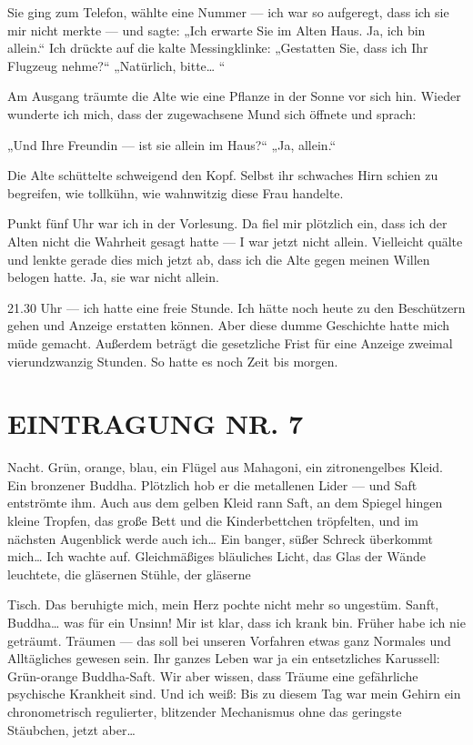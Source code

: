 Sie ging zum Telefon, wählte eine Nummer — ich war so aufgeregt,
dass ich sie mir nicht merkte — und sagte: „Ich erwarte Sie im
Alten Haus. Ja, ich bin allein.“ Ich drückte auf die kalte
Messingklinke: „Gestatten Sie, dass ich Ihr Flugzeug nehme?“
„Natürlich, bitte\ldots{} “

Am Ausgang träumte die Alte wie eine Pflanze in der Sonne vor sich
hin. Wieder wunderte ich mich, dass der zugewachsene Mund sich
öffnete und sprach:

„Und Ihre Freundin — ist sie allein im Haus?“ „Ja, allein.“

Die Alte schüttelte schweigend den Kopf. Selbst ihr schwaches Hirn
schien zu begreifen, wie tollkühn, wie wahnwitzig diese Frau
handelte.

Punkt fünf Uhr war ich in der Vorlesung. Da fiel mir plötzlich ein,
dass ich der Alten nicht die Wahrheit gesagt hatte — I war jetzt
nicht allein. Vielleicht quälte und lenkte gerade dies mich jetzt
ab, dass ich die Alte gegen meinen Willen belogen hatte. Ja, sie
war nicht allein.

21.30 Uhr — ich hatte eine freie Stunde. Ich hätte noch heute zu
den Beschützern gehen und Anzeige erstatten können. Aber diese
dumme Geschichte hatte mich müde gemacht. Außerdem beträgt die
gesetzliche Frist für eine Anzeige zweimal vierundzwanzig Stunden.
So hatte es noch Zeit bis morgen.

\section{EINTRAGUNG NR. 7}

Nacht. Grün, orange, blau, ein Flügel aus Mahagoni, ein
zitronengelbes Kleid. Ein bronzener Buddha. Plötzlich hob er die
metallenen Lider — und Saft entströmte ihm. Auch aus dem gelben
Kleid rann Saft, an dem Spiegel hingen kleine Tropfen, das große
Bett und die Kinderbettchen tröpfelten, und im nächsten Augenblick
werde auch ich\ldots{} Ein banger, süßer Schreck überkommt mich\ldots{} Ich
wachte auf. Gleichmäßiges bläuliches Licht, das Glas der Wände
leuchtete, die gläsernen Stühle, der gläserne

Tisch. Das beruhigte mich, mein Herz pochte nicht mehr so ungestüm.
Sanft, Buddha\ldots{} was für ein Unsinn! Mir ist klar, dass ich krank
bin. Früher habe ich nie geträumt. Träumen — das soll bei unseren
Vorfahren etwas ganz Normales und Alltägliches gewesen sein. Ihr
ganzes Leben war ja ein entsetzliches Karussell: Grün-orange
Buddha-Saft. Wir aber wissen, dass Träume eine gefährliche
psychische Krankheit sind. Und ich weiß: Bis zu diesem Tag war mein
Gehirn ein chronometrisch regulierter, blitzender Mechanismus ohne
das geringste Stäubchen, jetzt aber\ldots{}

